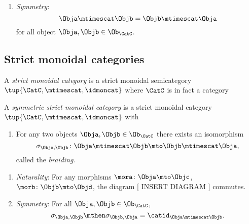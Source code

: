 {\begin{ctdefinition}
\condit
        
 \begin{enumerate}
 \item \emph{Symmetry}:
 \begin{equation}
     \Obja \mtimescat \Objb = \Objb \mtimescat \Obja
\end{equation}
for all object $\Obja, \Objb \in \Ob_\CatC$.
        \end{enumerate} 
    \end{ctdefinition}

   
   
   \subsection{Strict monoidal categories}
   
   
     \begin{ctdefinition}
        A \emph{strict monoidal category} is a strict monoidal semicategory $\tup{\CatC, \mtimescat, \idmoncat}$ where $\CatC$ is in fact a category 
    \end{ctdefinition}

  \begin{ctdefinition}
        A \emph{symmetric strict monoidal category} is a strict monoidal category $\tup{\CatC, \mtimescat, \idmoncat}$ with 
        
        \constit
        
        \begin{enumerate}
        \item For any two objects $\Obja, \Objb \in \Ob_\CatC$ there exists an isomorphism 
        \begin{equation}
        \sigma_{\Obja, \Objb} \colon \Obja \mtimescat   \Objb \mto \Objb \mtimescat   \Obja,
        \end{equation}
        called the \emph{braiding}.
        \end{enumerate}
        
        \condit
        
        \begin{enumerate} 
        \item \emph{Naturality}: For any morphisms $\mora \colon \Obja \mto \Objc$, $\morb \colon \Objb \mto \Objd$, the diagram 
        [ INSERT DIAGRAM ]
        commutes.
        \item \emph{Symmetry}: For all $\Obja, \Objb \in \Ob_\CatC$,
        \begin{equation}
        \sigma_{\Obja, \Objb} \mthen \sigma_{\Objb, \Obja} = \catid_{\Obja \mtimescat   \Objb}.
        \end{equation}
        \end{enumerate}
        
       
    \end{ctdefinition}

    
    

    
      

}
